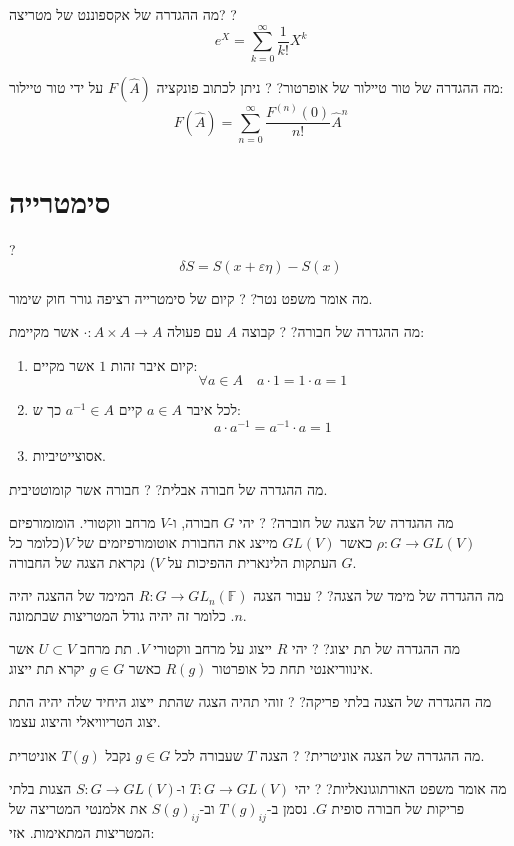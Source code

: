 \documentclass{tstextbook}
\begin{document}
מה ההגדרה של אקספוננט של מטריצה?
?
$$e^{X}=\sum_{k=0}^{\infty}{\frac{1}{k!}}X^{k}$$

מה ההגדרה של טור טיילור של אופרטור?
?
ניתן לכתוב פונקציה \(F\left( \hat{A} \right)\) על ידי טור טיילור:
$$F({\hat{A}})=\sum_{n=0}^{\infty}{\frac{F^{(n)}(0)}{n!}}{\hat{A}}^{n}$$

\section{סימטרייה}

?
$$\delta S=S\left( x+\varepsilon \eta \right)-S(x)$$

מה אומר משפט נטר?
?
קיום של סימטרייה רציפה גורר חוק שימור.

מה ההגדרה של חבורה?
?
קבוצה \(A\) עם פעולה \(\cdot:A\times A\to A\)  אשר מקיימת:

\begin{enumerate}
  \item קיום איבר זהות \(1\) אשר מקיים: 
$$\forall a \in A\quad a \cdot 1 = 1 \cdot a = 1$$


  \item לכל איבר \(a \in A\) קיים \(a^{-1} \in A\) כך ש: 
$$a \cdot a^{-1} = a ^{-1} \cdot a = 1$$


  \item אסוצייטיביות. 


\end{enumerate}
מה ההגדרה של חבורה אבלית?
?
חבורה אשר קומוטטיבית.

מה ההגדרה של הצגה של חוברה?
?
יהי \(G\) חבורה, ו-\(V\) מרחב ווקטורי. הומומורפיזם \(\rho:G\to GL(V)\) כאשר \(GL(V)\) מייצג את החבורת אוטומורפיזמים של \(V\)(כלומר כל העתקות הלינארית ההפיכות על \(V\)) נקראת הצגה של החבורה \(G\).

מה ההגדרה של מימד של הצגה?
?
עבור הצגה \(R:G\to GL_{n}\left( \mathbb{F}  \right)\) המימד של ההצגה יהיה \(n\). כלומר זה יהיה גודל המטריצות שבתמונה.

מה ההגדרה של תת יצוג?
?
יהי \(R\) ייצוג על מרחב ווקטורי \(V\). תת מרחב \(U\subset V\) אשר אינווריאנטי תחת כל אופרטור \(R(g)\) כאשר \(g\in G\) יקרא תת ייצוג.

מה ההגדרה של הצגה בלתי פריקה?
?
זוהי תהיה הצגה שהתת ייצוג היחיד שלה יהיה התת יצוג הטריוויאלי והיצוג עצמו.

מה ההגדרה של הצגה אוניטרית?
?
הצגה \(T\) שעבורה לכל \(g \in G\) נקבל \(T(g)\) אוניטרית.

מה אומר משפט האורתוגונאליות?
?
יהי \(T:G\to GL(V)\) ו-\(S:G\to GL(V)\) הצגות בלתי פריקות של חבורה סופית \(G\). נסמן ב-\(T(g)_{ij}\) וב-\(S(g)_{ij}\) את אלמנטי המטריצה של המטריצות המתאימות. אזי:
\end{document}
